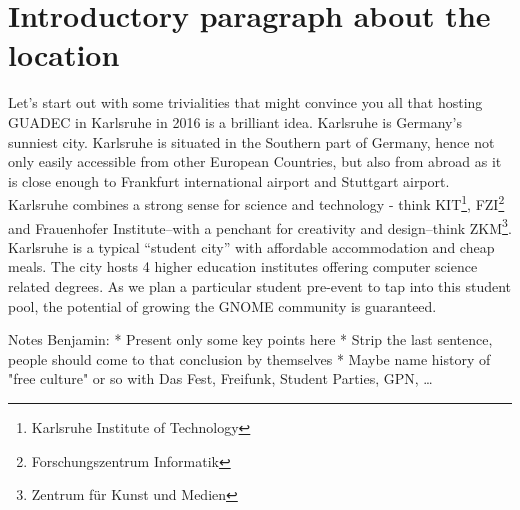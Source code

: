 \section{Introductory paragraph about the location}

Let's start out with some trivialities that might convince you all that hosting GUADEC in Karlsruhe in 2016 is a brilliant idea. Karlsruhe is Germany's sunniest city. Karlsruhe is situated in the Southern part of Germany, hence not only easily accessible from other European Countries, but also from abroad as it is close enough to Frankfurt international airport and Stuttgart airport. Karlsruhe combines a strong sense for science and technology - think KIT\footnote{Karlsruhe Institute of Technology}, FZI\footnote{Forschungszentrum Informatik} and Frauenhofer Institute–with a penchant for creativity and design–think ZKM\footnote{Zentrum für Kunst und Medien}. Karlsruhe is a typical “student city” with affordable accommodation and cheap meals. The city hosts 4 higher education institutes offering computer science related degrees. As we plan a particular student pre-event to tap into this student pool, the potential of growing the GNOME community is guaranteed.





Notes Benjamin:
 * Present only some key points here
 * Strip the last sentence, people should come to that conclusion by themselves
 * Maybe name history of "free culture" or so with Das Fest, Freifunk, Student Parties, GPN, …



